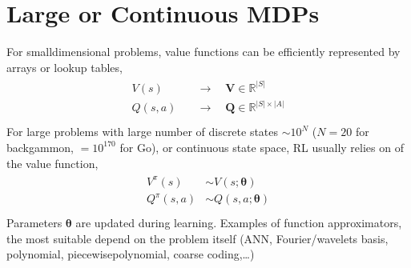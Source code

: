 \documentclass[letterpaper,10pt,english]{jupyterBook}
\begin{document}
\sphinxstepscope


\chapter{Large or Continuous MDPs}
\label{\detokenize{ch/rl/mdp_large_continuous:large-or-continuous-mdps}}\label{\detokenize{ch/rl/mdp_large_continuous:rl-mdp-sol-rl}}\label{\detokenize{ch/rl/mdp_large_continuous::doc}}
\sphinxAtStartPar
For small\sphinxhyphen{}dimensional problems, value functions can be efficiently represented by arrays or look\sphinxhyphen{}up tables,
\begin{equation*}
\begin{split}\begin{aligned}
  V(s)   \quad & \rightarrow \quad \mathbf{V} \in \mathbb{R}^{|S|} \\
  Q(s,a) \quad & \rightarrow \quad \mathbf{Q} \in \mathbb{R}^{|S| \times |A|} \\
\end{aligned}\end{split}
\end{equation*}
\sphinxAtStartPar
For large problems with large number of discrete states \(\sim 10^{N}\) (\(N = 20\) for backgammon, \(= 10^{170}\) for Go), or continuous state space, RL usually relies on  of the value function,
\begin{equation*}
\begin{split}\begin{aligned}
  V^{\pi}(s)   & \sim V(s  ; \boldsymbol{\theta}) \\
  Q^{\pi}(s,a) & \sim Q(s,a; \boldsymbol{\theta}) \\
\end{aligned}\end{split}
\end{equation*}
\sphinxAtStartPar
Parameters \(\boldsymbol{\theta}\) are updated during learning. Examples of function approximators, the most suitable depend on the problem itself (ANN, Fourier/wavelets basis, polynomial, piecewise\sphinxhyphen{}polynomial, coarse coding,…)
\end{document}
